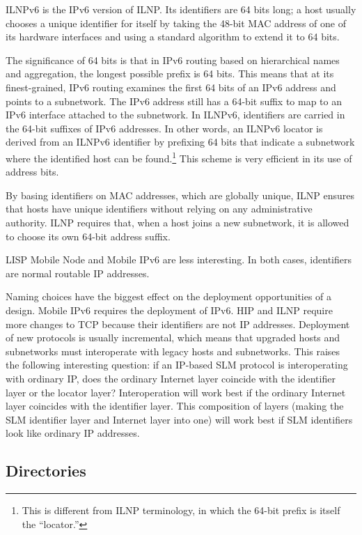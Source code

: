 ILNPv6 is the IPv6 version of ILNP.
Its identifiers are 64 bits long; a host usually chooses a unique
identifier for itself
by taking the 48-bit MAC address of one of its hardware
interfaces and using a standard algorithm to extend it to 64 bits.

The significance of 64 bits is that in IPv6 routing based on 
hierarchical names and aggregation, the longest possible prefix is
64 bits.
This means that at its finest-grained, IPv6 routing examines the
first 64 bits of an IPv6 address and points to a
subnetwork.
The IPv6 address still has a 64-bit suffix to map to an IPv6 interface
attached to the subnetwork.
In ILNPv6, 
identifiers are carried in the 64-bit suffixes of IPv6 addresses.
In other words, an ILNPv6 locator is derived from an ILNPv6 identifier
by prefixing 64 bits that indicate a subnetwork where the identified
host can be found.\footnote{This is different from ILNP terminology,
in which the 64-bit prefix is itself the ``locator.''} 
This scheme is very efficient in its use of address bits.

By basing identifiers on MAC addresses, which are globally unique,
ILNP ensures that hosts have unique identifiers without relying on any
administrative authority.
ILNP requires that, when a host joins a new subnetwork, it is allowed
to choose its own 64-bit address suffix.

LISP Mobile Node and Mobile IPv6 are less interesting.
In both cases, identifiers are normal routable IP addresses.

Naming choices have the biggest effect on the deployment opportunities
of a design.
Mobile IPv6 requires the deployment of IPv6.
HIP and ILNP require more changes to TCP because their identifiers
are not IP addresses.
Deployment of new protocols is usually incremental, which means
that upgraded hosts and subnetworks must interoperate with legacy
hosts and subnetworks.
This raises the following interesting question: if an IP-based
SLM protocol is interoperating with ordinary IP, does the ordinary Internet
layer coincide with the identifier layer or the locator layer?
Interoperation will work best if the ordinary Internet layer 
coincides with the identifier layer.
This composition of layers (making the SLM identifier layer and Internet
layer into one) will work best if SLM identifiers look like ordinary
IP addresses.

\subsection{Directories}

